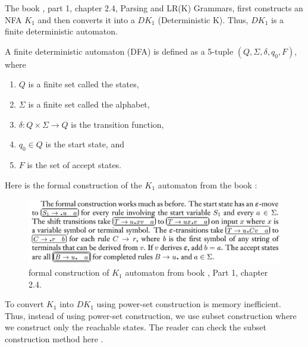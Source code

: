 The book \cite{sipser}, part 1, chapter 2.4, Parsing and LR(K) Grammars, first constructs an NFA \(K_{1}\) and then converts it into a \( DK_{1}\) (Deterministic K). Thus, \( DK_{1}\) is a finite deterministic automaton.

\begin{definition}[2.0]
    A finite deterministic automaton (DFA) is defined as a 5-tuple  \((Q, \Sigma, \delta, q_{0}, F)\), where
    \begin{enumerate}
        \item \(Q\) is a finite set called the states,
        \item \(\Sigma\) is a finite set called the alphabet,
        \item \(\delta : Q \times \Sigma \to Q\) is the transition function,
        \item \(q_{0} \in Q\) is the start state, and
        \item \(F\) is the set of accept states.
    \end{enumerate}
\end{definition}
\setlength{\parindent}{0pt}

\vspace{10pt}

Here is the formal construction of the \( K_{1}\) automaton from the book \cite{sipser}:


\begin{figure}[h!]
    \includegraphics[width=\linewidth]{DK1 formal specification.png}
    \caption{formal construction of \(K_{1}\) automaton from book \cite{sipser}, Part 1, chapter 2.4.}
    \label{figure 2}
\end{figure}

\vspace{15pt}

To convert \(K_{1}\) into \(DK_{1}\) using power-set construction is memory inefficient. Thus, instead of using power-set construction, we use subset construction where we construct only the reachable states. The reader can check the subset construction method here \cite{DFA}.\\

